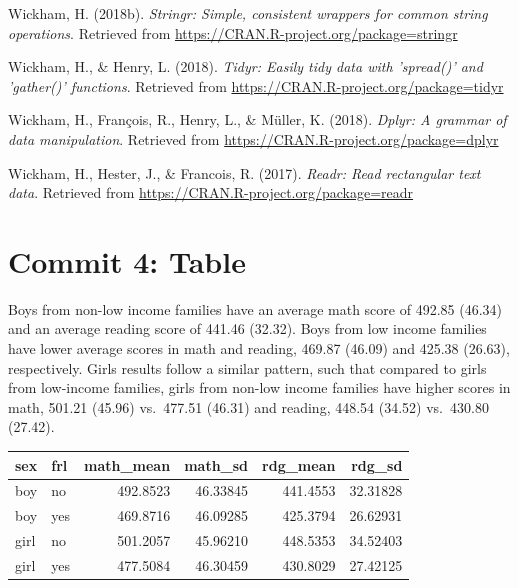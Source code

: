 \documentclass[man]{apa6}
\begin{document}
\hypertarget{ref-R-stringr}{}
Wickham, H. (2018b). \emph{Stringr: Simple, consistent wrappers for
common string operations}. Retrieved from
\url{https://CRAN.R-project.org/package=stringr}

\hypertarget{ref-R-tidyr}{}
Wickham, H., \& Henry, L. (2018). \emph{Tidyr: Easily tidy data with
'spread()' and 'gather()' functions}. Retrieved from
\url{https://CRAN.R-project.org/package=tidyr}

\hypertarget{ref-R-dplyr}{}
Wickham, H., François, R., Henry, L., \& Müller, K. (2018). \emph{Dplyr:
A grammar of data manipulation}. Retrieved from
\url{https://CRAN.R-project.org/package=dplyr}

\hypertarget{ref-R-readr}{}
Wickham, H., Hester, J., \& Francois, R. (2017). \emph{Readr: Read
rectangular text data}. Retrieved from
\url{https://CRAN.R-project.org/package=readr}

\endgroup

\section{Commit 4: Table}\label{commit-4-table}

Boys from non-low income families have an average math score of 492.85
(46.34) and an average reading score of 441.46 (32.32). Boys from low
income families have lower average scores in math and reading, 469.87
(46.09) and 425.38 (26.63), respectively. Girls results follow a similar
pattern, such that compared to girls from low-income families, girls
from non-low income families have higher scores in math, 501.21 (45.96)
vs.~477.51 (46.31) and reading, 448.54 (34.52) vs.~430.80 (27.42).

\begin{table}[H]
\centering\begingroup\fontsize{8}{10}\selectfont

\begin{tabular}{l|l|r|r|r|r}
\hline
sex & frl & math\_mean & math\_sd & rdg\_mean & rdg\_sd\\
\hline
boy & no & 492.8523 & 46.33845 & 441.4553 & 32.31828\\
\hline
boy & yes & 469.8716 & 46.09285 & 425.3794 & 26.62931\\
\hline
girl & no & 501.2057 & 45.96210 & 448.5353 & 34.52403\\
\hline
girl & yes & 477.5084 & 46.30459 & 430.8029 & 27.42125\\
\hline
\end{tabular}\endgroup{}
\end{table}
\end{document}
